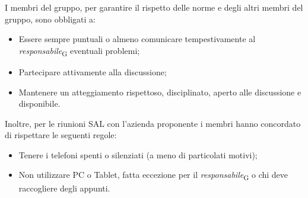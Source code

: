 I membri del gruppo, per garantire il rispetto delle norme e degli altri membri del gruppo, sono obbligati a:
\begin{itemize}
    \item Essere sempre puntuali o almeno comunicare tempestivamente al \textit{responsabile}\textsubscript{G} eventuali problemi;
    \item Partecipare attivamente alla discussione;
    \item Mantenere un atteggiamento rispettoso, disciplinato, aperto alle discussione e disponibile.
\end{itemize}
Inoltre, per le riunioni SAL con l'azienda proponente i membri hanno concordato di rispettare le seguenti regole:
\begin{itemize}
    \item Tenere i telefoni spenti o silenziati (a meno di particolati motivi);
    \item Non utilizzare PC o Tablet, fatta eccezione per il \textit{responsabile}\textsubscript{G} o chi deve raccogliere degli appunti.
\end{itemize}